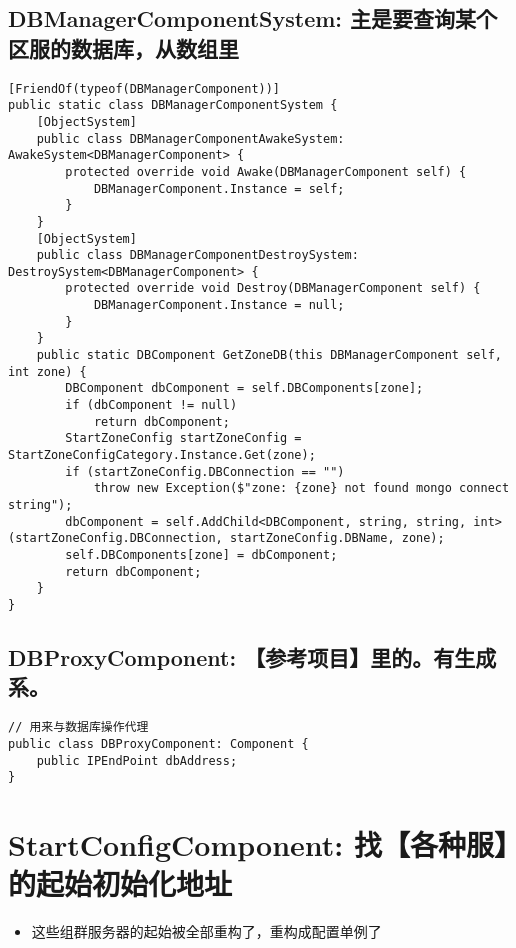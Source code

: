 \documentclass[9pt, b5paper]{article}
\begin{document}
\subsection{DBManagerComponentSystem: 主是要查询某个区服的数据库，从数组里}
\label{sec-6-4}
\begin{verbatim}
[FriendOf(typeof(DBManagerComponent))]
public static class DBManagerComponentSystem {
    [ObjectSystem]
    public class DBManagerComponentAwakeSystem: AwakeSystem<DBManagerComponent> {
        protected override void Awake(DBManagerComponent self) {
            DBManagerComponent.Instance = self;
        }
    }
    [ObjectSystem]
    public class DBManagerComponentDestroySystem: DestroySystem<DBManagerComponent> {
        protected override void Destroy(DBManagerComponent self) {
            DBManagerComponent.Instance = null;
        }
    }
    public static DBComponent GetZoneDB(this DBManagerComponent self, int zone) {
        DBComponent dbComponent = self.DBComponents[zone];
        if (dbComponent != null) 
            return dbComponent;
        StartZoneConfig startZoneConfig = StartZoneConfigCategory.Instance.Get(zone);
        if (startZoneConfig.DBConnection == "") 
            throw new Exception($"zone: {zone} not found mongo connect string");
        dbComponent = self.AddChild<DBComponent, string, string, int>(startZoneConfig.DBConnection, startZoneConfig.DBName, zone);
        self.DBComponents[zone] = dbComponent;
        return dbComponent;
    }
}
\end{verbatim}
\subsection{DBProxyComponent: 【参考项目】里的。有生成系。}
\label{sec-6-5}
\begin{verbatim}
// 用来与数据库操作代理
public class DBProxyComponent: Component {
    public IPEndPoint dbAddress;
}
\end{verbatim}


\section{StartConfigComponent: 找【各种服】的起始初始化地址}
\label{sec-7}
\begin{itemize}
\item 这些组群服务器的起始被全部重构了，重构成配置单例了
\end{itemize}
\end{document}
